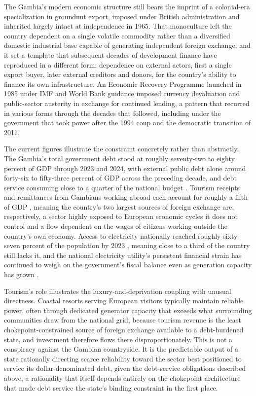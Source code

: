 \documentclass[11pt]{article}
\begin{document}
The Gambia's modern economic structure still bears the imprint of a colonial-era specialization in groundnut export, imposed under British administration and inherited largely intact at independence in 1965. That monoculture left the country dependent on a single volatile commodity rather than a diversified domestic industrial base capable of generating independent foreign exchange, and it set a template that subsequent decades of development finance have reproduced in a different form: dependence on external actors, first a single export buyer, later external creditors and donors, for the country's ability to finance its own infrastructure. An Economic Recovery Programme launched in 1985 under IMF and World Bank guidance imposed currency devaluation and public-sector austerity in exchange for continued lending, a pattern that recurred in various forms through the decades that followed, including under the government that took power after the 1994 coup and the democratic transition of 2017.

The current figures illustrate the constraint concretely rather than abstractly. The Gambia's total government debt stood at roughly seventy-two to eighty percent of GDP through 2023 and 2024, with external public debt alone around forty-six to fifty-three percent of GDP across the preceding decade, and debt service consuming close to a quarter of the national budget \cite{mofea2025, coface2025}. Tourism receipts and remittances from Gambians working abroad each account for roughly a fifth of GDP \cite{coface2025}, meaning the country's two largest sources of foreign exchange are, respectively, a sector highly exposed to European economic cycles it does not control and a flow dependent on the wages of citizens working outside the country's own economy. Access to electricity nationally reached roughly sixty-seven percent of the population by 2023 \cite{worldbank2023electricity}, meaning close to a third of the country still lacks it, and the national electricity utility's persistent financial strain has continued to weigh on the government's fiscal balance even as generation capacity has grown \cite{imf2025gambia}.

Tourism's role illustrates the luxury-and-deprivation coupling with unusual directness. Coastal resorts serving European visitors typically maintain reliable power, often through dedicated generator capacity that exceeds what surrounding communities draw from the national grid, because tourism revenue is the least chokepoint-constrained source of foreign exchange available to a debt-burdened state, and investment therefore flows there disproportionately. This is not a conspiracy against the Gambian countryside. It is the predictable output of a state rationally directing scarce reliability toward the sector best positioned to service its dollar-denominated debt, given the debt-service obligations described above, a rationality that itself depends entirely on the chokepoint architecture that made debt service the state's binding constraint in the first place.
\end{document}
